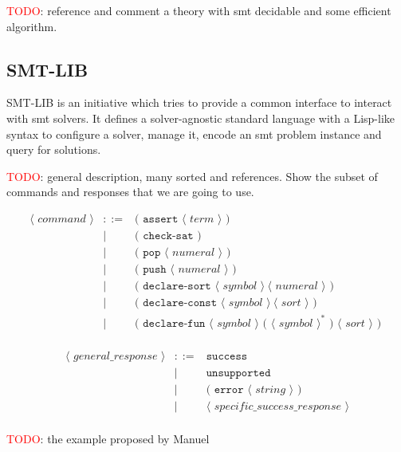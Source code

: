 \textcolor{red}{TODO}: reference and comment a theory with smt decidable and some 
efficient algorithm.

\subsection{SMT-LIB}
\label{prelim:smtlib}

SMT-LIB is an initiative which tries to provide a common interface to interact
with \acrshort{smt} solvers. It defines a solver-agnostic standard language with
a Lisp-like syntax to configure a solver, manage it, encode an \gls{smt} problem
instance and query for solutions.

\textcolor{red}{TODO}: general description, many sorted and references. 
Show the subset of commands and responses that we are going to use.

\[
\begin{array}{rcll}
\langle\textit{ command }\rangle & ::= & \texttt{( assert } \langle\textit{ term }\rangle\texttt{ ) }\\
& | & \texttt{( check-sat )}\\
& | & \texttt{( pop } \langle\textit{ numeral }\rangle \texttt{ ) }\\
& | & \texttt{( push } \langle\textit{ numeral }\rangle \texttt{ ) }\\
& | & \texttt{( declare-sort } \langle\textit{ symbol }\rangle~\langle\textit{ numeral }\rangle\texttt{ ) }\\
& | & \texttt{( declare-const } \langle\textit{ symbol }\rangle~\langle\textit{ sort }\rangle\texttt{ ) }\\
& | & \texttt{( declare-fun } \langle\textit{ symbol }\rangle \texttt{ ( }\langle\textit{ symbol }\rangle^* \texttt{ ) }\langle\textit{ sort }\rangle\texttt{ ) }\\
\end{array}
\]

\[
\begin{array}{rcll}
\langle\textit{ general\_response }\rangle & ::= & \texttt{success}\\
& | & \texttt{unsupported}\\
& | & \texttt{( error } \langle\textit{ string }\rangle \texttt{ ) }\\
& | & \langle\textit{ specific\_success\_response }\rangle\\
\end{array}
\]

\textcolor{red}{TODO}: the example proposed by Manuel

